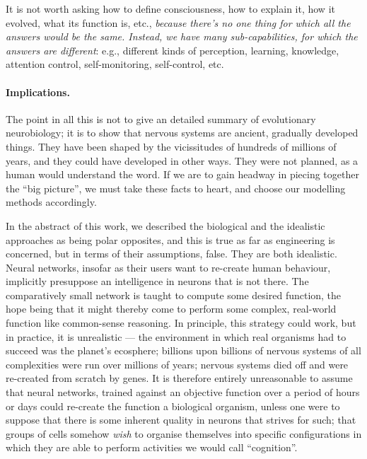 \begin{emquote}
It is not worth asking how to define consciousness, how to explain it, how it evolved, what its function is, etc., {\em because there's no one thing for which all the answers would be the same. Instead, we have many sub-capabilities, for which the answers are different}: e.g., different kinds of perception, learning, knowledge, attention control, self-monitoring, self-control, etc.
\end{emquote}

\paragraph{Implications.} The point in all this is not to give an detailed summary of evolutionary neurobiology; it is to show that nervous systems are ancient, gradually developed things. They have been shaped by the vicissitudes of hundreds of millions of years, and they could have developed in other ways. They were not planned, as a human would understand the word. If we are to gain headway in piecing together the ``big picture'', we must take these facts to heart, and choose our modelling methods accordingly.

In the abstract of this work, we described the biological and the idealistic approaches as being polar opposites, and this is true as far as engineering is concerned, but in terms of their assumptions, false. They are both idealistic. Neural networks, insofar as their users want to re-create human behaviour, implicitly presuppose an intelligence in neurons that is not there. The comparatively small network is taught to compute some desired function, the hope being that it might thereby come to perform some complex, real-world function like common-sense reasoning. In principle, this strategy could work, but in practice, it is unrealistic --- the environment in which real organisms had to succeed was the planet's ecosphere; billions upon billions of nervous systems of all complexities were run over millions of years; nervous systems died off and were re-created from scratch by genes. It is therefore entirely unreasonable to assume that neural networks, trained against an objective function over a period of hours or days could re-create the function a biological organism, unless one were to suppose that there is some inherent quality in neurons that strives for such; that groups of cells somehow {\em wish} to organise themselves into specific configurations in which they are able to perform activities we would call ``cognition''. 

